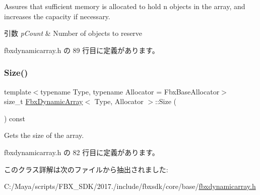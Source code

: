 Assures that sufficient memory is allocated to hold n objects in the array, and increases the capacity if necessary. 
\begin{DoxyParams}{引数}
{\em p\+Count} & Number of objects to reserve \\
\hline
\end{DoxyParams}


 fbxdynamicarray.\+h の 89 行目に定義があります。

\mbox{\label{class_fbx_dynamic_array_a700fb46d36230bd9ed41f6c6fb420d0b}} 
\subsubsection{\texorpdfstring{Size()}{Size()}}
{\footnotesize\ttfamily template$<$typename Type, typename Allocator = Fbx\+Base\+Allocator$>$ \\
size\+\_\+t \hyperlink{class_fbx_dynamic_array}{Fbx\+Dynamic\+Array}$<$ Type, Allocator $>$\+::Size (\begin{DoxyParamCaption}{ }\end{DoxyParamCaption}) const\hspace{0.3cm}{\ttfamily [inline]}}



Gets the size of the array. 



 fbxdynamicarray.\+h の 82 行目に定義があります。



このクラス詳解は次のファイルから抽出されました\+:\begin{DoxyCompactItemize}
\item 
C\+:/\+Maya/scripts/\+F\+B\+X\+\_\+\+S\+D\+K/2017./include/fbxsdk/core/base/\hyperlink{fbxdynamicarray_8h}{fbxdynamicarray.\+h}\end{DoxyCompactItemize}

